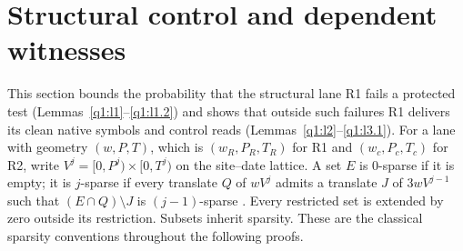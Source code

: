 \section{Structural control and dependent witnesses}\label{q1:clock}

This section bounds the probability that the structural lane R1 fails a protected test (Lemmas~\ref{q1:l1}--\ref{q1:l1.2}) and shows that outside such failures R1 delivers its clean native symbols and control reads (Lemmas~\ref{q1:l2}--\ref{q1:l3.1}). For a lane with geometry \((w,P,T)\), which is \((w_R,P_R,T_R)\) for R1 and \((w_c,P_c,T_c)\) for R2, write \(V^j=[0,P^j)\times[0,T^j)\) on the site--date lattice. A set \(E\) is 0-sparse if it is empty; it is \(j\)-sparse if every translate \(Q\) of \(wV^j\) admits a translate \(J\) of \(3wV^{j-1}\) such that \((E\cap Q)\setminus J\) is \((j-1)\)-sparse \cite[Definition~\ref*{cl:def:sparse}]{DMNoise1D2026}. Every restricted set is extended by zero outside its restriction. Subsets inherit sparsity. These are the classical sparsity conventions throughout the following proofs.


